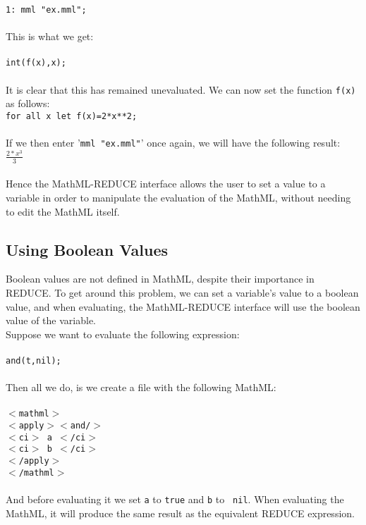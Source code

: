 \documentclass{article}
\begin{document}
{\tt 1: mml "ex.mml";}\\
\\
This is what we get:
\\
\\
{\tt int(f(x),x);}\\
\\
It is clear that this has remained unevaluated. We can now set the function
{\tt f(x)} as follows:\\

{\tt for all x let f(x)=2*x**2;}\\
\\
If we then enter '{\tt mml "ex.mml"}' once again, we will have the
following result:\\

{\Large \( \frac {2*x^{3}}{3}\)}
\\
\\
Hence the MathML-REDUCE interface allows the user to set a value to a
variable in order to manipulate the evaluation of the MathML, without needing
to edit the MathML itself.

\subsection{Using Boolean Values}

Boolean values are not defined in MathML, despite their importance in REDUCE.
To get around this problem, we can set a variable's value to a boolean value,
and when evaluating, the MathML-REDUCE interface will use the boolean value
of the variable.
\\
Suppose we want to evaluate the following expression:
\\
\\
{\tt and(t,nil);}
\\
\\
Then all we do, is we create a file with the following MathML:
\\
\\
{\tt          $<$mathml$>$\\
\hspace*{2mm} $<$apply$>$$<$and/$>$\\
\hspace*{5mm}         $<$ci$>$ a $<$/ci$>$\\
\hspace*{5mm}         $<$ci$>$ b $<$/ci$>$\\
\hspace*{2mm}      $<$/apply$>$\\
        $<$/mathml$>$\\}
\\
And before evaluating it we set {\tt a} to {\tt true} and {\tt b} to {\tt
nil}. When evaluating the MathML, it will produce the same result as the
equivalent REDUCE expression.
\end{document}
